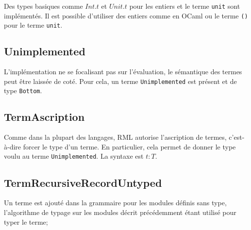 Des types basiques comme $Int.t$ et $Unit.t$ pour les entiers et le terme
\verb|unit| sont implémentés. Il est possible d'utiliser des entiers comme en
OCaml ou le terme \verb|()| pour le terme \verb|unit|.

\subsection*{Unimplemented}

L'implémentation ne se focalisant pas sur l'évaluation, le sémantique des termes
peut être laissée de coté. Pour cela, un terme \verb|Unimplemented| est présent
et de type \verb|Bottom|.

\subsection*{TermAscription}

Comme dans la plupart des langages, RML autorise l'ascription de termes,
c'est-à-dire forcer le type d'un terme. En particulier, cela permet de donner le
type voulu au terme \verb|Unimplemented|. La syntaxe est $t : T$.

\subsection*{TermRecursiveRecordUntyped}

Un terme est ajouté dans la grammaire pour les modules définis sans type,
l'algorithme de typage sur les modules décrit précédemment étant utilisé pour
typer le terme;


%
%
%

